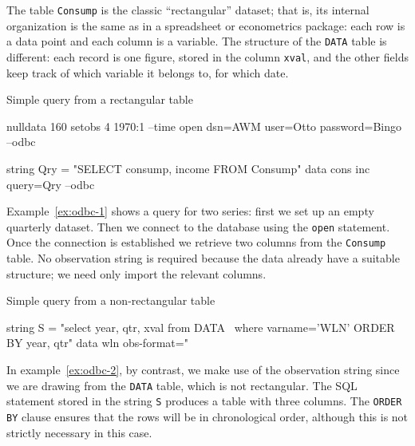 The table \texttt{Consump} is the classic ``rectangular'' dataset;
that is, its internal organization is the same as in a spreadsheet or
econometrics package: each row is a data point and each column is a
variable. The structure of the \texttt{DATA} table
is different: each record is one figure, stored in the column
\texttt{xval}, and the other fields keep track of which variable it
belongs to, for which date.

\begin{script}[htbp]
  \caption{Simple query from a rectangular table}
  \label{ex:odbc-1}
\begin{scode}
nulldata 160
setobs 4 1970:1 --time
open dsn=AWM user=Otto password=Bingo --odbc

string Qry = "SELECT consump, income FROM Consump"
data cons inc query=Qry --odbc
\end{scode}
\end{script}

Example~\ref{ex:odbc-1} shows a query for two series: first we set up
an empty quarterly dataset. Then we connect to the database using the
\texttt{open} statement. Once the connection is established we
retrieve two columns from the \texttt{Consump} table. No observation
string is required because the data already have a suitable structure;
we need only import the relevant columns.

\begin{script}[htbp]
  \caption{Simple query from a non-rectangular table}
  \label{ex:odbc-2}
\begin{scode}
string S = "select year, qtr, xval from DATA \
       where varname='WLN' ORDER BY year, qtr"
data wln obs-format="%
\end{scode}
\end{script}

In example~\ref{ex:odbc-2}, by contrast, we make use of the
observation string since we are drawing from the \texttt{DATA}
table, which is not rectangular. The SQL statement stored in the
string \texttt{S} produces a table with three columns. The
\texttt{ORDER BY} clause ensures that the rows will be in
chronological order, although this is not strictly necessary in this
case.

